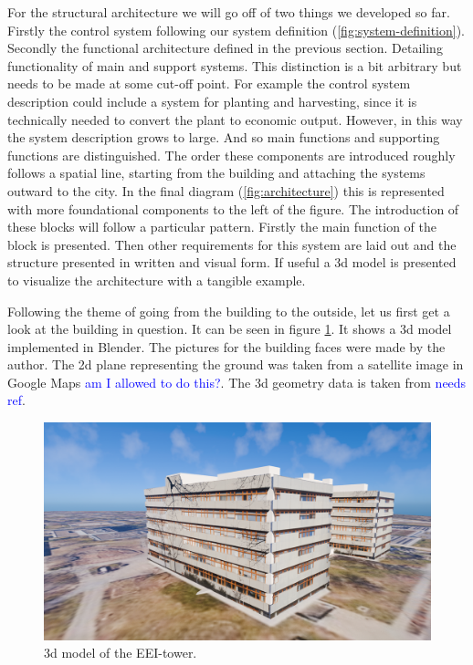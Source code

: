 For the structural architecture we will go off of two things we developed so far.
Firstly the control system following our system definition (\ref{fig:system-definition}).
Secondly the functional architecture defined in the previous section.
Detailing functionality of main and support systems.
This distinction is a bit arbitrary but needs to be made at some cut-off point.
For example the control system description could include a system for planting and harvesting, since it is technically needed to convert the plant to economic output.
However, in this way the system description grows to large.
And so main functions and supporting functions are distinguished.
The order these components are introduced roughly follows a spatial line, starting from the building and attaching the systems outward to the city.
In the final diagram (\ref{fig:architecture}) this is represented with more foundational components to the left of the figure.
The introduction of these blocks will follow a particular pattern.
Firstly the main function of the block is presented.
Then other requirements for this system are laid out and the structure presented in written and visual form.
If useful a 3d model is presented to visualize the architecture with a tangible example.

Following the theme of going from the building to the outside, let us first get a look at the building in question.
It can be seen in figure \ref{fig:3d-building}.
It shows a 3d model implemented in Blender.
The pictures for the building faces were made by the author.
The 2d plane representing the ground was taken from a satellite image in Google Maps \textcolor{Blue}{am I allowed to do this?}.
The 3d geometry data is taken from \textcolor{Blue}{needs ref}.
\begin{figure}[htbp]
  \centering
  \includegraphics[width=\textwidth]{img/3d_model/building.png}
  \caption{3d model of the EEI-tower.}
  \label{fig:3d-building}
\end{figure}

